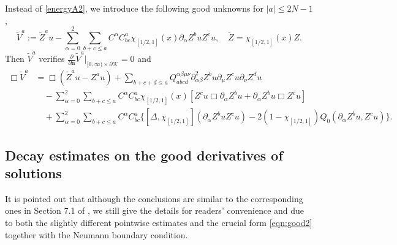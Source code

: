 \documentclass[11pt,twoside]{article}
\def\cK{\mathcal K}
\def\ds{\displaystyle}
\def\p{\partial}
\def\bn{\mathbf{n}}
\theoremstyle{plain}
\theoremstyle{definition}
\numberwithin{equation}{section}
\begin{document}
Instead of \eqref{energyA2}, we introduce the following good unknowns for $|a|\le2N-1$,
\begin{equation}\label{good2}
\tilde V^a:=\tilde Z^au-\sum_{\alpha=0}^2\sum_{b+c\le a}C^{\alpha}C^a_{bc}\chi_{[1/2,1]}(x)\p_{\alpha}Z^buZ^cu,\quad \tilde Z=\chi_{[1/2,1]}(x)Z.
\end{equation}
Then $\tilde V^a$ verifies $\ds\frac{\p}{\p\bn}\tilde V^a|_{[0,\infty)\times\p\cK}=0$ and
\begin{equation}\label{eqn:good2}
\begin{split}
\Box\tilde V^a&=\Box(\tilde Z^au-Z^au)+\sum_{b+c+d\le a}Q_{abcd}^{\alpha\beta\mu\nu}\p^2_{\alpha\beta}Z^bu\p_{\mu}Z^cu\p_{\nu}Z^du\\
&\quad-\sum_{\alpha=0}^2\sum_{b+c\le a}C^{\alpha}C^a_{bc}\chi_{[1/2,1]}(x)[Z^cu\Box\p_{\alpha}Z^bu+\p_{\alpha}Z^bu\Box Z^cu]\\
&\quad+\sum_{\alpha=0}^2\sum_{b+c\le a}C^{\alpha}C^a_{bc}\{[\Delta,\chi_{[1/2,1]}](\p_{\alpha}Z^buZ^cu)
-2(1-\chi_{[1/2,1]})Q_0(\p_{\alpha}Z^bu,Z^cu)\}.
\end{split}
\end{equation}

\subsection{Decay estimates on the good derivatives of solutions}

It is pointed out that although the conclusions are similar to the corresponding ones in Section 7.1
of \cite{HouYinYuan24}, we still give the details for readers' convenience and due to both the slightly
different pointwise estimates and the crucial form \eqref{eqn:good2} together with the Neumann boundary condition.
\end{document}
